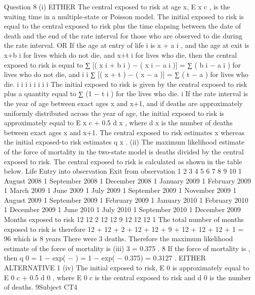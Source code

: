 \documentclass[a4paper,12pt]{article}
\begin{document}
\begin{enumerate}
[Total 9]

Question 8
(i)
EITHER
The central exposed to risk at age x, E x c , is the waiting time in a multiple-state or
Poisson model.
The initial exposed to risk is equal to the central exposed to risk plus the time elapsing
between the date of death and the end of the rate interval for those who are observed
to die during the rate interval.
OR
If the age at entry of life i is x + a i , and the age at exit is x+b i for lives which do not
die, and x+t i for lives who die, then the central exposed to risk is equal to
∑ [( x i + b i ) − ( x i − a i )] = ∑ ( b i − a i ) for lives who do not die, and
i
i
∑ [( x + t ) − ( x − a )] = ∑ ( t − a ) for lives who die.
i
i
i
i
i
i
i
i
The initial exposed to risk is given by the central exposed to risk plus a quantity equal
to ∑ (1 − t i ) for the lives who die.
i
If the rate interval is the year of age between exact ages x and x+1, and if deaths are
approximately uniformly distributed across the year of age, the initial exposed to risk
is approximately equal to E x c + 0.5 d x , where d x is the number of deaths between exact
ages x and x+1.
The central exposed to risk estimates \mu x whereas the initial exposed-to risk estimates
q x .
(ii)
The maximum likelihood estimate of the force of mortality in the two-state model is
deaths divided by the central exposed to risk.
The central exposed to risk is calculated as shown in the table below.
Life Entry into
observation Exit from
observation
1
2
3
4
5
6
7
8
9
10 1 August 2008
1 September 2008
1 December 2008
1 January 2009
1 February 2009
1 March 2009
1 June 2009
1 July 2009
1 September 2009
1 November 2009 1 August 2009
1 September 2009
1 February 2009
1 January 2010
1 February 2010
1 December 2009
1 June 2010
1 July 2010
1 September 2010
1 December 2009
Months
exposed
to risk
12
12
2
12
12
9
12
12
12
1
The total number of months exposed to risk is therefore
12 + 12 + 2 + 12 + 12 + 9 + 12 + 12 + 12 + 1 = 96
which is 8 years
There were 3 deaths.
Therefore the maximum likelihood estimate of the force of mortality is
(iii)
3
= 0.375 .
8
If the force of mortality is  , then
q 0 = 1 − exp( − ) = 1 − exp( − 0.375) = 0.3127 .
EITHER ALTERNATIVE 1
(iv)
The initial exposed to risk, E 0 is approximately equal to E 0 c + 0.5 d 0 , where E 0 c is the
central exposed to risk and d 0 is the number of deaths.
9Subject CT4 %

\end{enumerate}
\end{document}
